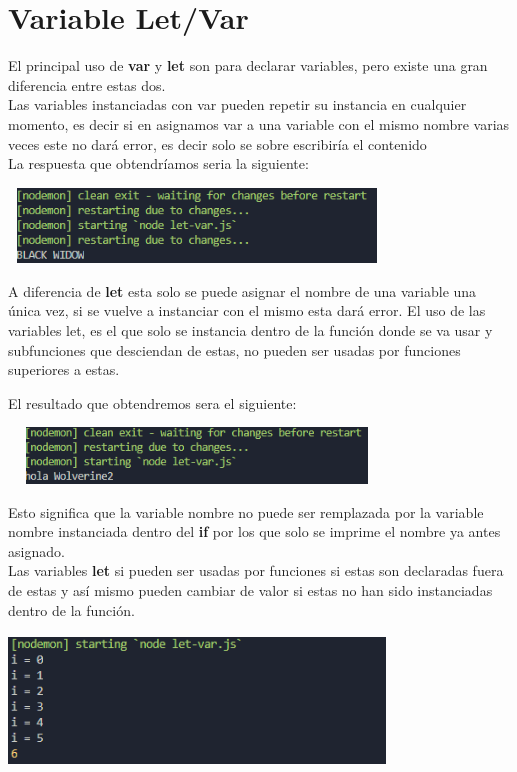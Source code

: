\documentclass{report}
\begin{document}
\chapter{Variable Let/Var}
El principal uso de \textbf{var} y \textbf{let} son para declarar variables, pero existe una gran diferencia entre estas dos.\\
Las variables instanciadas con var pueden repetir su instancia en cualquier momento, es decir si en asignamos var a una variable con el mismo nombre varias veces este no dará error, es decir solo se sobre escribiría el contenido\\

La respuesta que obtendríamos seria la siguiente:\\
\begin{center}
  \includegraphics[width=10cm, height=2cm]{1.PNG}
\end{center}
A diferencia de \textbf{let} esta solo se puede asignar el nombre de una variable una única vez, si se vuelve a instanciar con el mismo esta dará error.
El uso de las variables let, es el que solo se instancia   dentro de la función donde se va usar y subfunciones que desciendan de estas, no pueden ser usadas por funciones superiores a estas.

El resultado que obtendremos sera el siguiente:
\begin{center}
  \includegraphics[width=10cm, height=1.5cm]{2.PNG}
\end{center}
Esto significa que la variable nombre no puede ser remplazada por la variable nombre instanciada dentro del  \textbf{if} por los que solo se imprime el nombre ya antes asignado.
\\
Las variables \textbf{let} si pueden ser usadas por funciones si estas son declaradas fuera de estas y así mismo pueden cambiar de valor si estas no han sido instanciadas dentro de la función.

\begin{center}
  \includegraphics[width=10cm, height=3.5cm]{3.PNG}
\end{center}
\end{document}
